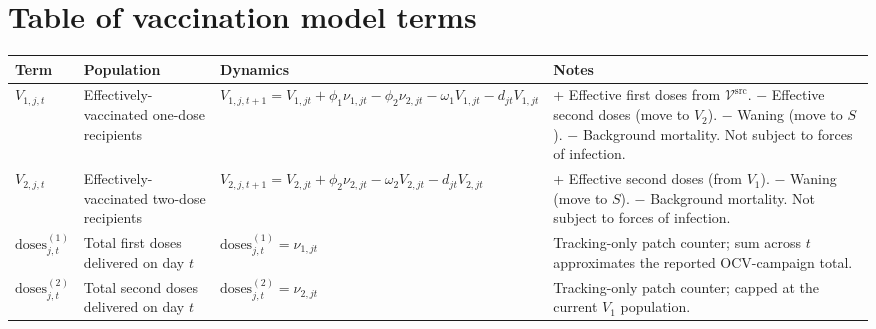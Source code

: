 \documentclass[
]{book}
\begin{document}
\label{vaccination-table}

\section{Table of vaccination model terms}\label{table-of-vaccination-model-terms}

\begin{longtable}[]{@{}
  >{\raggedright\arraybackslash}p{}
  >{\raggedright\arraybackslash}p{}
  >{\raggedright\arraybackslash}p{}
  >{\raggedright\arraybackslash}p{}@{}}
\toprule\noalign{}
\begin{minipage}[b]{\linewidth}\raggedright
Term
\end{minipage} & \begin{minipage}[b]{\linewidth}\raggedright
Population
\end{minipage} & \begin{minipage}[b]{\linewidth}\raggedright
Dynamics
\end{minipage} & \begin{minipage}[b]{\linewidth}\raggedright
Notes
\end{minipage} \\
\midrule\noalign{}
\endhead
\bottomrule\noalign{}
\endlastfoot
\(V_{1,j,t}\) & Effectively-vaccinated one-dose recipients & \(V_{1,j,t+1} = V_{1,jt} + \phi_1\nu_{1,jt} - \phi_2\nu_{2,jt} - \omega_1 V_{1,jt} - d_{jt}V_{1,jt}\) & + Effective first doses from \(\mathcal{V}^{\text{src}}\). \(-\) Effective second doses (move to \(V_2\)). \(-\) Waning (move to \(S\)). \(-\) Background mortality. Not subject to forces of infection. \\
\(V_{2,j,t}\) & Effectively-vaccinated two-dose recipients & \(V_{2,j,t+1} = V_{2,jt} + \phi_2\nu_{2,jt} - \omega_2 V_{2,jt} - d_{jt}V_{2,jt}\) & + Effective second doses (from \(V_1\)). \(-\) Waning (move to \(S\)). \(-\) Background mortality. Not subject to forces of infection. \\
\(\text{doses}^{(1)}_{j,t}\) & Total first doses delivered on day \(t\) & \(\text{doses}^{(1)}_{j,t} = \nu_{1,jt}\) & Tracking-only patch counter; sum across \(t\) approximates the reported OCV-campaign total. \\
\(\text{doses}^{(2)}_{j,t}\) & Total second doses delivered on day \(t\) & \(\text{doses}^{(2)}_{j,t} = \nu_{2,jt}\) & Tracking-only patch counter; capped at the current \(V_1\) population. \\
\end{longtable}
\end{document}
